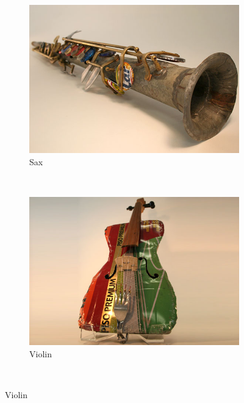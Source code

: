 \begin{itemize}
\begin{figure}
    \centering
    \begin{subfigure}[b]{0.3\textwidth}
        \includegraphics[width=\textwidth]{graphics/landfill_harmonic-sax.jpg}
        \caption{Sax}
        \label{fig:gull}
    \end{subfigure}
    ~ %
    \begin{subfigure}[b]{0.3\textwidth}
        \includegraphics[width=\textwidth]{graphics/landfill_harmonic-violin.jpg}
        \caption{Violin}
        \label{fig:tiger}
    \end{subfigure}
    ~ %

\end{figure}
\end{itemize}
